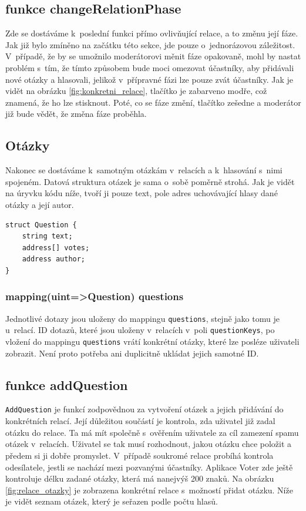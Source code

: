 \subsection*{funkce changeRelationPhase}
Zde se dostáváme k~poslední funkci přímo ovlivňující relace, a to změnu její fáze. Jak již bylo zmíněno na začátku této sekce, jde pouze o~jednorázovou záležitost. V~případě, že by se umožnilo moderátorovi měnit fáze opakovaně, mohl by nastat problém s~tím, že tímto způsobem bude moci omezovat účastníky, aby přidávali nové otázky a hlasovali, jelikož v~přípravné fázi lze pouze zvát účastníky. Jak je vidět na obrázku \ref{fig:konkretni_relace}, tlačítko je zabarveno modře, což znamená, že ho lze stisknout. Poté, co se fáze změní, tlačítko zešedne a moderátor již bude vědět, že změna fáze proběhla.
\subsection{Otázky}
Nakonec se dostáváme k~samotným otázkám v~relacích a k~hlasování s~nimi spojeném. Datová struktura otázek je sama o~sobě poměrně strohá. Jak je vidět na úryvku kódu níže, tvoří ji pouze text, pole adres uchovávající hlasy dané otázky a její autor.
\begin{verbatim}
struct Question {
    string text;
    address[] votes;
    address author;
}
\end{verbatim}  

\subsubsection*{mapping(uint=>Question) questions}
Jednotlivé dotazy jsou uloženy do mappingu \texttt{questions}, stejně jako tomu je u~relací. ID dotazů, které jsou uloženy v~relacích v~poli \texttt{questionKeys}, po vložení do mappingu \texttt{questions} vrátí konkrétní otázky, které lze posléze uživateli zobrazit. Není proto potřeba ani duplicitně ukládat jejich samotné ID.
\subsection*{funkce addQuestion}
\texttt{AddQuestion} je funkcí zodpovědnou za vytvoření otázek a jejich přidávání do konkrétních relací. Její důležitou součástí je kontrola, zda uživatel již zadal otázku do relace. Ta má mít společně s~ověřením uživatele za cíl zamezení spamu otázek v~relacích. Uživatel se tak musí rozhodnout, jakou otázku chce položit a předem si ji dobře promyslet. V~případě soukromé relace probíhá kontrola odesílatele, jestli se nachází mezi pozvanými účastníky. Aplikace Voter zde ještě kontroluje délku zadané otázky, která má nanejvýš 200 znaků. Na obrázku \ref{fig:relace_otazky} je zobrazena konkrétní relace s~možností přidat otázku. Níže je vidět seznam otázek, který je seřazen podle počtu hlasů. 
